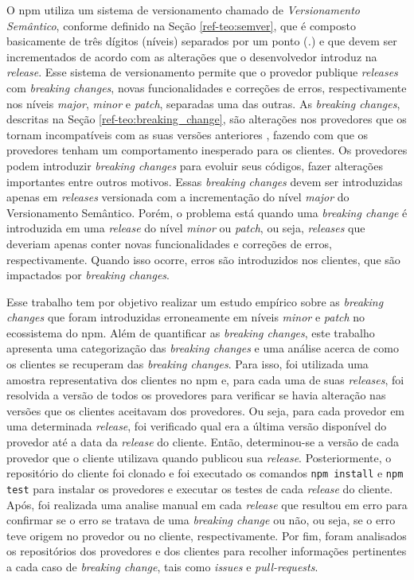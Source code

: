 O \textsf{npm} utiliza um sistema de versionamento chamado de \textit{Versionamento Semântico}, conforme definido na Seção \ref{ref-teo:semver}, que é composto basicamente de três dígitos (níveis) separados por um ponto (\textit{.}) e que devem ser incrementados de acordo com as alterações que o desenvolvedor introduz na \textit{release}. Esse sistema de versionamento permite que o provedor publique \textit{releases} com \textit{breaking changes}, novas funcionalidades e correções de erros, respectivamente nos níveis \textit{major}, \textit{minor} e \textit{patch}, separadas uma das outras. As \textit{breaking changes}, descritas na Seção \ref{ref-teo:breaking_change}, são alterações nos provedores que os tornam incompatíveis com as suas versões anteriores \cite{intro:break_change}, fazendo com que os provedores tenham um comportamento inesperado para os clientes. Os provedores podem introduzir \textit{breaking changes} para evoluir seus códigos, fazer alterações importantes entre outros motivos. Essas \textit{breaking changes} devem ser introduzidas apenas em \textit{releases} versionada com a incrementação do nível \textit{major} do Versionamento Semântico. Porém, o problema está quando uma \textit{breaking change} é introduzida em uma \textit{release} do nível \textit{minor} ou \textit{patch}, ou seja, \textit{releases} que deveriam apenas conter novas funcionalidades e correções de erros, respectivamente. Quando isso ocorre, erros são introduzidos nos clientes, que são impactados por \textit{breaking changes}.

Esse trabalho tem por objetivo realizar um estudo empírico sobre as \textit{breaking changes} que foram introduzidas erroneamente em níveis \textit{minor} e \textit{patch} no ecossistema do \textsf{npm}. Além de quantificar as \textit{breaking changes}, este trabalho apresenta uma categorização das \textit{breaking changes} e uma análise acerca de como os clientes se recuperam das \textit{breaking changes}. Para isso, foi utilizada uma amostra representativa dos clientes no \textsf{npm} e, para cada uma de suas \textit{releases}, foi resolvida a versão de todos os provedores para verificar se havia alteração nas versões que os clientes aceitavam dos provedores. Ou seja, para cada provedor em uma determinada \textit{release}, foi verificado qual era a última versão disponível do provedor até a data da \textit{release} do cliente. Então, determinou-se a versão de cada provedor que o cliente utilizava quando publicou sua \textit{release}. Posteriormente, o repositório do cliente foi clonado e foi executado os comandos \texttt{npm install} e \texttt{npm test} para instalar os provedores e executar os testes de cada \textit{release} do cliente. Após, foi realizada uma analise manual em cada \textit{release} que resultou em erro para confirmar se o erro se tratava de uma \textit{breaking change} ou não, ou seja, se o erro teve origem no provedor ou no cliente, respectivamente. Por fim, foram analisados os repositórios dos provedores e dos clientes para recolher informações pertinentes a cada caso de \textit{breaking change}, tais como \textit{issues} e \textit{pull-requests}.

